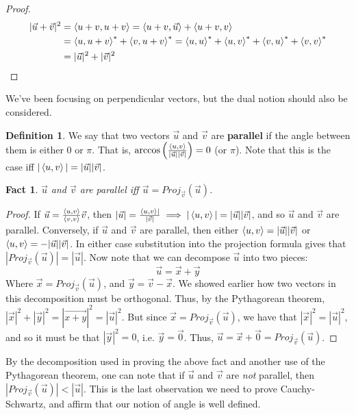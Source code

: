 \documentclass{article}
\theoremstyle{definition}
\newtheorem{definition}{Definition}[section]
\theoremstyle{plain}
\theoremstyle{theorem}
\newtheorem{fact}{Fact}[section]
\begin{document}
\begin{proof}
	\begin{align*}
		|\vec{u}+\vec{v}|^2 &= \braket{u+v,u+v} = \braket{u+v,\vec{u}}+\braket{u+v,v} \\
		&= \braket{u,u+v}^*+\braket{v,u+v}^* = \braket{u,u}^*+\braket{u,v}^*+\braket{v,u}^*+\braket{v,v}^* \\
		&= |\vec{u}|^2+|\vec{v}|^2
	\end{align*}
\end{proof}
We've been focusing on perpendicular vectors, but the dual notion should also be considered.
\begin{definition}
	We say that two vectors $\vec{u}$ and $\vec{v}$ are \textbf{parallel} if the angle between them is either $0$ or $\pi$. That is, $\arccos\left(\frac{\braket{u,v}}{|\vec{u}||\vec{v}|}\right) = 0$ (or $\pi$). Note that this is the case iff $|\braket{u,v}| = |\vec{u}||\vec{v}|$.
\end{definition}
\begin{fact}
	$\vec{u}$ and $\vec{v}$ are parallel iff $\vec{u} = Proj_{\vec{v}}(\vec{u})$.
\end{fact}
\begin{proof}
	If $\vec{u} = \frac{\braket{u,v}}{\braket{v,v}}\vec{v}$, then $|\vec{u}| = \frac{\braket{u,v}|}{|\vec{v}|} \implies |\braket{u,v}| = |\vec{u}||\vec{v}|$, and so $\vec{u}$ and $\vec{v}$ are parallel. Conversely, if $\vec{u}$ and $\vec{v}$ are parallel, then either $\braket{u,v} = |\vec{u}||\vec{v}|$ or $\braket{u,v} = -|\vec{u}||\vec{v}|$. In either case substitution into the projection formula gives that $|Proj_{\vec{v}}(\vec{u})| = |\vec{u}|$. Now note that we can decompose $\vec{u}$ into two pieces:
	\[\vec{u} = \vec{x}+\vec{y} \]
	Where $\vec{x} = Proj_{\vec{v}}(\vec{u})$, and $\vec{y} = \vec{v}-\vec{x}$. We showed earlier how two vectors in this decomposition must be orthogonal. Thus, by the Pythagorean theorem, $|\vec{x}|^2+|\vec{y}|^2 = |\vec{x+y}|^2 = |\vec{u}|^2$. But since $\vec{x} = Proj_{\vec{v}}(\vec{u})$, we have that $|\vec{x}|^2 = |\vec{u}|^2$, and so it must be that $|\vec{y}|^2 = 0$, i.e. $\vec{y} = \vec{0}$. Thus, $\vec{u} = \vec{x} + \vec{0} = Proj_{\vec{v}}(\vec{u})$.
\end{proof}
By the decomposition used in proving the above fact and another use of the Pythagorean theorem, one can note that if $\vec{u}$ and $\vec{v}$ are \textit{not} parallel, then $|Proj_{\vec{v}}(\vec{u})| < |\vec{u}|$. This is the last observation we need to prove Cauchy-Schwartz, and affirm that our notion of angle is well defined.
\end{document}
